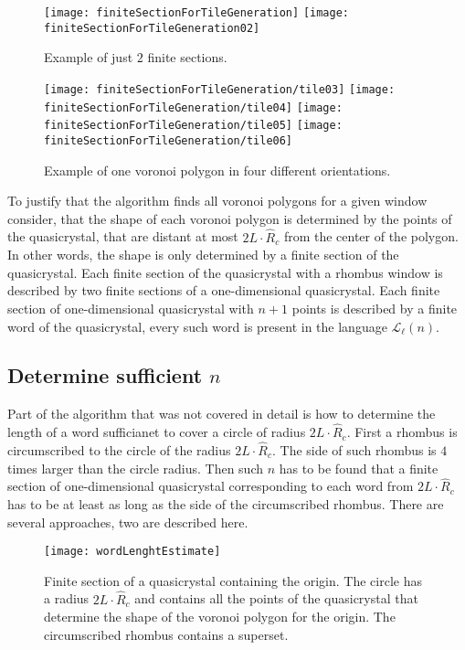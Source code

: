\documentclass[text.tex]{subfiles}
\begin{document}
\begin{figure}[h]
\centering
\texttt{[image: finiteSectionForTileGeneration]}
\texttt{[image: finiteSectionForTileGeneration02]}
\caption{Example of just $2$ finite sections.}
\label{fig:finiteSectionForTileGeneration}
\end{figure}

\begin{figure}[h]
\centering
\texttt{[image: finiteSectionForTileGeneration/tile03]}
\texttt{[image: finiteSectionForTileGeneration/tile04]}
\texttt{[image: finiteSectionForTileGeneration/tile05]}
\texttt{[image: finiteSectionForTileGeneration/tile06]}
\caption{Example of one voronoi polygon in four different orientations.}
\label{fig:finiteSectionForTileGeneration:more}
\end{figure}

To justify that the algorithm finds all voronoi polygons for a given window consider, that the shape of each voronoi polygon is determined by the points of the quasicrystal, that are distant at most $2L\cdot\hat{R}_c$ from the center of the polygon. In other words, the shape is only determined by a finite section of the quasicrystal. Each finite section of the quasicrystal with a rhombus window is described by two finite sections of a one-dimensional quasicrystal. Each finite section of one-dimensional quasicrystal with $n+1$ points is described by a finite word of the quasicrystal, every such word is present in the language $\mathcal{L}_{\ell}(n)$.

\subsection{Determine sufficient $n$}
Part of the algorithm that was not covered in detail is how to determine the length of a word sufficianet to cover a circle of radius $2L\cdot\hat{R}_c$. First a rhombus is circumscribed to the circle of the radius $2L\cdot\hat{R}_c$. The side of such rhombus is $4$ times larger than the circle radius. Then such $n$ has to be found that a finite section of one-dimensional quasicrystal corresponding to each word from $2L\cdot\hat{R}_c$ has to be at least as long as the side of the circumscribed rhombus. 
There are several approaches, two are described here. 

\begin{figure}[h]
\centering
\texttt{[image: wordLenghtEstimate]}
\caption{Finite section of a quasicrystal containing the origin. The circle has a radius $2L\cdot\hat{R}_c$ and contains all the points of the quasicrystal that determine the shape of the voronoi polygon for the origin. The circumscribed rhombus contains a superset.}
\label{fig:wordLenghtEstimate}
\end{figure}
\end{document}
